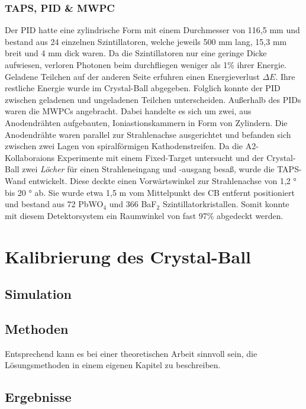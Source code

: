 \documentclass[a4paper,11pt,oneside,final,german,openbib,pdftex]{scrbook}
\begin{document}
\subsection{TAPS, PID \& MWPC}
Der PID hatte eine zylindrische Form mit einem Durchmesser von 116,5 mm und bestand aus 24 einzelnen Szintillatoren, welche jeweils 500 mm lang, 15,3 mm breit und 4 mm dick waren. Da die Szintillatoren nur eine geringe Dicke aufwiesen, verloren Photonen beim durchfliegen weniger als 1\% ihrer Energie. Geladene Teilchen auf der anderen Seite erfuhren einen Energieverlust $\Delta E$. Ihre restliche Energie wurde im Crystal-Ball abgegeben. Folglich konnte der PID zwischen geladenen und ungeladenen Teilchen unterscheiden. 
Au{\ss}erhalb des PIDs waren die MWPCs angebracht. Dabei handelte es sich um zwei, aus Anodendr\"ahten aufgebauten, Ioniastionskammern in Form von Zylindern. Die Anodendr\"ahte waren parallel zur Strahlenachse ausgerichtet und befanden sich zwischen zwei Lagen von spiralf\"ormigen Kathodenstreifen. 
Da die A2-Kollaboraions Experimente mit einem Fixed-Target untersucht und der Crystal-Ball zwei \textit{L\"ocher} f\"ur einen Strahleneingang und -ausgang besa{\ss}, wurde die TAPS-Wand entwickelt. Diese deckte einen Vorw\"artswinkel zur Strahlenachse von 1,2 ° bis 20 ° ab. Sie wurde etwa 1,5 m vom Mittelpunkt des CB entfernt positioniert und bestand aus 72 PbWO$_4$ und 366 BaF$_2$ Szintillatorkristallen. Somit konnte mit diesem Detektorsystem ein Raumwinkel von fast 97\% abgedeckt werden.


\chapter{Kalibrierung des Crystal-Ball}

\section{Simulation}


\section{Methoden}

Entsprechend kann es bei einer theoretischen Arbeit sinnvoll sein,
die L\"osungsmethoden in einem eigenen Kapitel zu beschreiben.

\section{Ergebnisse}
\end{document}
